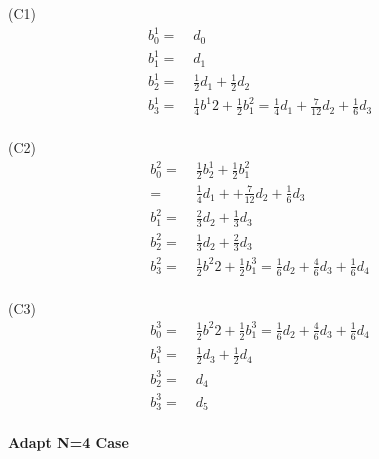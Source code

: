 \documentclass[12pt]{article}
\begin{document}
(C1)
\begin{align*}
b^{1}_{0} =&\; d_0 \\
b^{1}_{1} =&\; d_1 \\
b^{1}_{2} =&\; \frac{1}{2} d_1 + \frac{1}{2}d_2 \\
b^{1}_{3} =&\; \frac{1}{4} b^{1}{2} + \frac{1}{2} b^{2}_{1} =\frac{1}{4}d_1 +\frac{7}{12}d_2 + \frac{1}{6}d_3 \\
\end{align*}

(C2)
\begin{align*}
b^{2}_{0} =&\; \frac{1}{2} b^{1}_{2} + \frac{1}{2} b^{2}_{1}\\
=&\; \frac{1}{4} d_1 + +\frac{7}{12}d_2 + \frac{1}{6}d_3 \\
b^{2}_{1} =&\; \frac{2}{3} d_2 + \frac{1}{3}d_3 \\
b^{2}_{2} =&\; \frac{1}{3} d_2 + \frac{2}{3}d_3 \\
b^{2}_{3} =&\; \frac{1}{2} b^{2}{2} + \frac{1}{2} b^{3}_{1} =\frac{1}{6}d_2 +\frac{4}{6}d_3 + \frac{1}{6}d_4 \\
\end{align*}

(C3)
\begin{align*}
b^{3}_{0} =&\; \frac{1}{2} b^{2}{2} + \frac{1}{2} b^{3}_{1} =\frac{1}{6}d_2 +\frac{4}{6}d_3 + \frac{1}{6}d_4 \\
b^{3}_{1} =&\; \frac{1}{2}d_3 + \frac{1}{2} d_4 \\
b^{3}_{2} =&\; d_4 \\
b^{3}_{3} =&\; d_5 \\
\end{align*}





\vspace {.25 cm}\noindent
{\bf Adapt N=4 Case} \\
\end{document}
